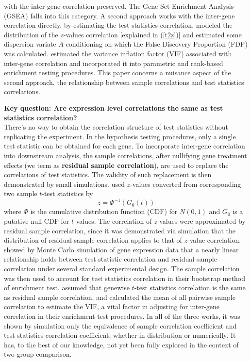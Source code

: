 \documentclass[12pt, a4paper]{article}
\begin{document}
	 with the	inter-gene correlation preserved. The Gene Set Enrichment Analysis (GSEA)
	\citep{subramanian2005gene} falls into this category. A second approach works with the inter-gene
	correlation directly, by estimating the test statistics correlation. \citet{efron2007correlation}
	modeled the distribution of the $z$-values correlation [explained in (\ref{t2z})] and estimated some
	dispersion variate $A$ conditioning on which the False Discovery Proportion (FDP) was calculated.
	\citet{wu2012camera} estimated the variance inflation factor (VIF) associated with inter-gene
	correlation and incorporated it into parametric and rank-based enrichment testing procedures. This
	paper concerns a nuisance aspect of the second approach, the relationship between sample
	correlations and test statistics correlations. 
	
	\textbf{Key question: Are  expression level correlations the same as test statistics correlation?}\\
	There's no way to obtain the correlation structure of test statistics without replicating the
	experiment.  
	In the hypothesis testing procedures, only a single test statistic can be obtained for each gene. To
	incorporate inter-gene correlation into downstream analysis,  the sample correlations, after
	nullifying gene treatment effects (we term as \textbf{residual sample correlation}), are used to
	replace the correlations of test statistics. The validity of such replacement is then demonstrated
	by small simulations. \citet{efron2007correlation} used $z$-values converted from corresponding two
	sample $t$-test statistics by 
	\begin{equation}\label{t2z}
		z  = \Phi^{-1}(G_0(t))
	\end{equation}
	where $\Phi$ is the cumulative distribution function (CDF) for $N(0, 1)$ and $G_0$ is a putative
	null CDF for $t$-values. The correlation of $z$-values were approximated by residual sample
	correlation, since it was demonstrated via simulation that the distribution of residual sample
	correlation applies to that of $z$-value correlation. \citet{barry2008statistical} showed by Monte
	Carlo simulation of gene expression data that a nearly linear relationship holds between test
	statistic correlation and residual sample correlation under several standard experimental design.
	The sample correlation was then used to account for test statistics correlation in their bootstrap
	method of enrichment test. \citet{wu2012camera} assumed that genewise $t$-test statistics correlation
	is the same as residual sample correlation, and calculated the mean of all pairwise sample
	correlation to estimate the VIF, a vital factor in adjusting for inter-gene correlation in their
	enrichment test procedures. In all of the three works, it was shown by simulation only the
	equivalence of sample correlation coefficient and test statistics correlation coefficient, whether
	in distribution or numerically. It has, to the best of our knowledge, not yet been fully explored in
	the context of two group comparison.
	
\end{document}
